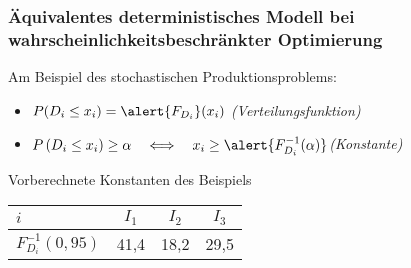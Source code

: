 \begin{frame}
 \frametitle{Äquivalentes deterministisches Modell bei wahrscheinlichkeitsbeschränkter Optimierung}
 Am Beispiel des stochastischen Produktionsproblems:
 \begin{itemize}
  \item $P(D_i\leq x_i) = \alert{F_{D_i}}(x_i)$ \quad\alert{\textsl{(Verteilungsfunktion)}}\medskip
  \item $P\left(D_i\leq x_i\right) \geq \alpha \quad\Longleftrightarrow\quad x_i \geq \alert{F^{-1}_{D_i}(\alpha)}$\quad \alert{\textsl{(Konstante)}}
 \end{itemize}
 
 \begin{block}{Vorberechnete Konstanten des Beispiels}
  \begin{center}
  \begin{tabular}{lccc}
    \toprule
    $i$ & $I_1$ & $I_2$ & $I_3$\\
    \midrule
    $F^{-1}_{D_i}(0,95)$ & 41,4 & 18,2 & 29,5\\
    \bottomrule
  \end{tabular}
  \end{center}
 \end{block}
\end{frame}


